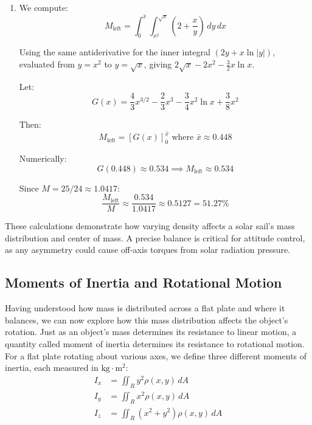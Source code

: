 \begin{example}
\begin{solution}
\begin{enumerate}
    Therefore:
    \[
    \bar{y}M = \int_0^1 (x + x^{3/2} - x^4 - x^3)\,dx = 0.45
    \]

    Hence:
    \[
    \bar{y} = \frac{0.45}{25/24} = 0.432
    \]

    \[
    (\bar{x}, \bar{y}) = (0.448, 0.432)
    \]

    \item We compute:
    \[
    M_{\text{left}} = \int_0^{\bar{x}} \int_{x^2}^{\sqrt{x}} \left(2 + \frac{x}{y}\right)\,dy\,dx
    \]

    Using the same antiderivative for the inner integral $(2y + x\ln|y|)$, 
    evaluated from $y=x^2$ to $y=\sqrt{x}$, giving $2\sqrt{x} - 2x^2 - \frac{3}{2}x\ln x$.

    Let:
    \[
    G(x) = \frac{4}{3}x^{3/2} - \frac{2}{3}x^3 - \frac{3}{4}x^2\ln x + \frac{3}{8}x^2
    \]

    Then:
    \[
    M_{\text{left}} = \left[G(x)\right]_0^{\bar{x}} \text{ where } \bar{x} \approx 0.448
    \]

    Numerically:
    \[
    G(0.448) \approx 0.534 \implies M_{\text{left}} \approx 0.534
    \]

    Since $M = 25/24 \approx 1.0417$:
    \[
    \frac{M_{\text{left}}}{M} \approx \frac{0.534}{1.0417} \approx 0.5127 = 51.27\%
    \]
\end{enumerate}

\noindent These calculations demonstrate how varying density affects a solar sail's mass distribution and center of mass. A precise balance is critical for attitude control, as any asymmetry could cause off-axis torques from solar radiation pressure.
\end{solution}
\end{example}
\exampleline

\subsection*{Moments of Inertia and Rotational Motion}  

\noindent Having understood how mass is distributed across a flat plate and where it balances, we can now explore how this mass distribution affects the object's rotation. Just as an object's mass determines its resistance to linear motion, a quantity called moment of inertia determines its resistance to rotational motion. \\

\noindent For a flat plate rotating about various axes, we define three different moments of inertia, each measured in $\text{kg} \cdot \text{m}^2$:
\begin{align*}
I_x &= \iint_R y^2\rho(x,y)\,dA \\
I_y &= \iint_R x^2\rho(x,y)\,dA \\
I_z &= \iint_R (x^2 + y^2)\rho(x,y)\,dA
\end{align*}

